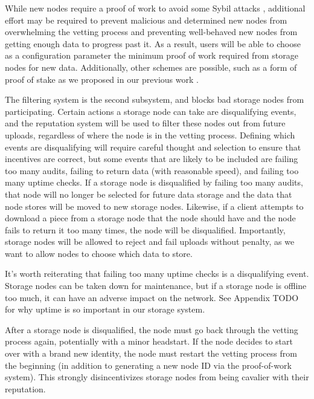 \documentclass[a4paper,10pt]{article} \usepackage[utf8]{inputenc}
\newcommand{\todo}[1]{{\color{red} TODO #1 }}
\begin{document}
While new nodes require a proof of work to avoid some Sybil attacks
\cite{sybil-attack}, additional effort may be required to prevent
malicious and determined new nodes from overwhelming the vetting process and
preventing well-behaved new nodes from getting enough data to progress past it.
As a result, users will be able to choose as a configuration parameter the
minimum proof of work required from storage nodes for new data. Additionally,
other schemes are possible, such as a form of proof of stake as we proposed in
our previous work \cite{sybil-cost}.

The filtering system is the second subsystem, and blocks bad storage nodes from
participating.
Certain actions a storage node can take are disqualifying events, and the
reputation system will be used to filter these nodes out from future uploads,
regardless of where the node is in the vetting process.
Defining which events are disqualifying will 
require careful thought and selection to ensure
that incentives are correct, 
but some events that are likely to be included are failing too many audits,
failing to return data (with reasonable speed), and failing too many uptime
checks.
If a storage node is disqualified by failing too many audits, that node will no
longer be selected for future data storage and the data that node stores will
be moved to new storage nodes.
Likewise, if a client attempts to download a piece from a storage node that
the node should have and the node fails to return it too many times, the
node will be disqualified. Importantly, storage nodes will be allowed to reject
and fail uploads without penalty, as we want to allow nodes to choose which data
to store.

It's worth reiterating that failing too many uptime checks is a disqualifying
event. Storage nodes can be taken down for maintenance, but if a storage node
is offline too much, it can have an adverse impact on the network. See Appendix
\todo{} for why uptime is so important in our storage system.

After a storage node is disqualified, the node must go back through the vetting
process again, potentially with a minor headstart. If the node decides to start
over with a brand new identity, the node must restart the vetting process from
the beginning (in addition to generating a new node ID via the proof-of-work
system). This strongly disincentivizes storage nodes from being cavalier with
their reputation.
\end{document}
